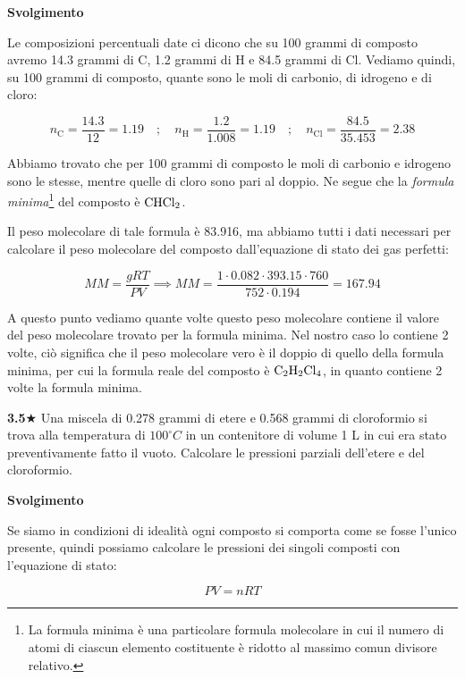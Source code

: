 \vspace{0.2cm}\large\textbf{Svolgimento}\normalsize

\vspace{0.2cm}Le composizioni percentuali date ci dicono che su 100 grammi di composto avremo 14.3 grammi di C, 1.2 grammi di H e 84.5 grammi di Cl. Vediamo quindi, su 100 grammi di composto, quante sono le moli di carbonio, di idrogeno e di cloro:

$$n_{\text{C}}=\frac{14.3}{12}=1.19
\quad;\quad
n_{\text{H}}=\frac{1.2}{1.008}=1.19
\quad;\quad
n_{\text{Cl}}=\frac{84.5}{35.453}=2.38$$

Abbiamo trovato che per 100 grammi di composto le moli di carbonio e idrogeno sono le stesse, mentre quelle di cloro sono pari al doppio. Ne segue che la \textit{formula minima}\footnote{La formula minima è una particolare formula molecolare in cui il numero di atomi di ciascun elemento costituente è ridotto al massimo comun divisore relativo.} del composto è $\rm CHCl_2$.

Il peso molecolare di tale formula è 83.916, ma abbiamo tutti i dati necessari per calcolare il peso molecolare del composto dall'equazione di stato dei gas perfetti:

$$MM=\frac{gRT}{PV} \implies MM=\frac{1 \cdot 0.082 \cdot 393.15 \cdot 760}{752 \cdot 0.194}=167.94$$

A questo punto vediamo quante volte questo peso molecolare contiene il valore del peso molecolare trovato per la formula minima. Nel nostro caso lo contiene 2 volte, ciò significa che il peso molecolare vero è il doppio di quello della formula minima, per cui la formula reale del composto è $\rm C_2H_2Cl_4$, in quanto contiene 2 volte la formula minima.

\vspace{0.2cm}\textbf{3.5}$\bigstar$ Una miscela di 0.278 grammi di etere e 0.568 grammi di cloroformio si trova alla temperatura di $100^{\circ}C$ in un contenitore di volume 1 L in cui era stato preventivamente fatto il vuoto. Calcolare le pressioni parziali dell'etere e del cloroformio.

\vspace{0.2cm}\large\textbf{Svolgimento}\normalsize

\vspace{0.2cm}Se siamo in condizioni di idealità ogni composto si comporta come se fosse l'unico presente, quindi possiamo calcolare le pressioni dei singoli composti con l'equazione di stato:

$$PV=nRT$$


